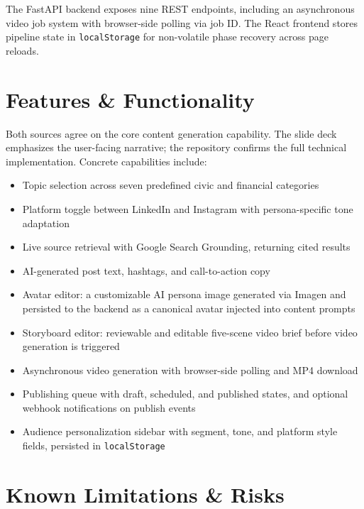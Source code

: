 \documentclass[12pt, letterpaper]{article}
\begin{document}
The FastAPI backend exposes nine REST endpoints, including an asynchronous video job
system with browser-side polling via job ID. The React frontend stores pipeline state
in \texttt{localStorage} for non-volatile phase recovery across page reloads.

\section{Features \& Functionality}

Both sources agree on the core content generation capability. The slide deck emphasizes
the user-facing narrative; the repository confirms the full technical implementation.
Concrete capabilities include:

\begin{itemize}[leftmargin=1.5em]
  \item Topic selection across seven predefined civic and financial categories
  \item Platform toggle between LinkedIn and Instagram with persona-specific tone
    adaptation
  \item Live source retrieval with Google Search Grounding, returning cited results
  \item AI-generated post text, hashtags, and call-to-action copy
  \item Avatar editor: a customizable AI persona image generated via Imagen and
    persisted to the backend as a canonical avatar injected into content prompts
  \item Storyboard editor: reviewable and editable five-scene video brief before
    video generation is triggered
  \item Asynchronous video generation with browser-side polling and MP4 download
  \item Publishing queue with draft, scheduled, and published states, and optional
    webhook notifications on publish events
  \item Audience personalization sidebar with segment, tone, and platform style
    fields, persisted in \texttt{localStorage}
\end{itemize}

\section{Known Limitations \& Risks}
\end{document}
